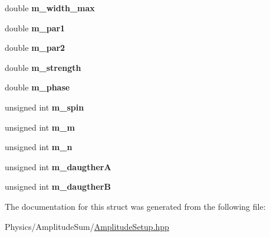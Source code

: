 \begin{DoxyCompactItemize}
\item 
\hypertarget{struct_resonance_aae6f37d58ee8ea168b28fff6db5065ff}{double {\bfseries m\-\_\-width\-\_\-max}}\label{struct_resonance_aae6f37d58ee8ea168b28fff6db5065ff}

\item 
\hypertarget{struct_resonance_a27cb65818c601155ee1641cfc69d9083}{double {\bfseries m\-\_\-par1}}\label{struct_resonance_a27cb65818c601155ee1641cfc69d9083}

\item 
\hypertarget{struct_resonance_aaba127e953445911c9ffc289fd5722e4}{double {\bfseries m\-\_\-par2}}\label{struct_resonance_aaba127e953445911c9ffc289fd5722e4}

\item 
\hypertarget{struct_resonance_a924fdc23c262d0536bb1c0aafcf167d9}{double {\bfseries m\-\_\-strength}}\label{struct_resonance_a924fdc23c262d0536bb1c0aafcf167d9}

\item 
\hypertarget{struct_resonance_a9979c547069b4a452c276a63da896a72}{double {\bfseries m\-\_\-phase}}\label{struct_resonance_a9979c547069b4a452c276a63da896a72}

\item 
\hypertarget{struct_resonance_a00abdd3572d15ba4474a1c31c1dc96ef}{unsigned int {\bfseries m\-\_\-spin}}\label{struct_resonance_a00abdd3572d15ba4474a1c31c1dc96ef}

\item 
\hypertarget{struct_resonance_ab9adb4ca4e03de9163a175be1c322685}{unsigned int {\bfseries m\-\_\-m}}\label{struct_resonance_ab9adb4ca4e03de9163a175be1c322685}

\item 
\hypertarget{struct_resonance_a6fddfde0c0200d51fd25496d17beb44d}{unsigned int {\bfseries m\-\_\-n}}\label{struct_resonance_a6fddfde0c0200d51fd25496d17beb44d}

\item 
\hypertarget{struct_resonance_a375c70fee829f4e5dd3a6ab9f266e7aa}{unsigned int {\bfseries m\-\_\-daugther\-A}}\label{struct_resonance_a375c70fee829f4e5dd3a6ab9f266e7aa}

\item 
\hypertarget{struct_resonance_ab5f5db09dd23c0e2bf1af0f8bcef96b2}{unsigned int {\bfseries m\-\_\-daugther\-B}}\label{struct_resonance_ab5f5db09dd23c0e2bf1af0f8bcef96b2}

\end{DoxyCompactItemize}


The documentation for this struct was generated from the following file\-:\begin{DoxyCompactItemize}
\item 
Physics/\-Amplitude\-Sum/\hyperlink{_amplitude_setup_8hpp}{Amplitude\-Setup.\-hpp}\end{DoxyCompactItemize}
